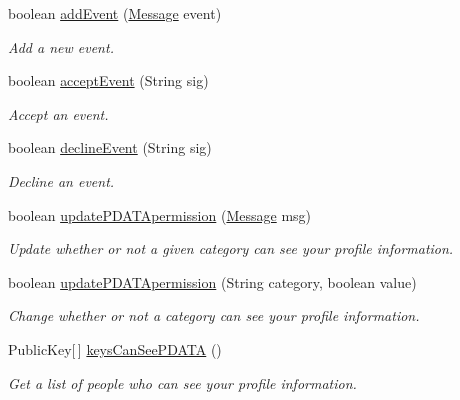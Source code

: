 \begin{DoxyCompactItemize}
boolean \hyperlink{classballmerpeak_1_1turtlenet_1_1server_1_1Database_a484dad4e2e272c608996a4a6bbb463a4}{add\-Event} (\hyperlink{classballmerpeak_1_1turtlenet_1_1shared_1_1Message}{Message} event)
\begin{DoxyCompactList}\small\item\em Add a new event. \end{DoxyCompactList}\item 
boolean \hyperlink{classballmerpeak_1_1turtlenet_1_1server_1_1Database_a30d0cd474644f531f6bfded6c9a63506}{accept\-Event} (String sig)
\begin{DoxyCompactList}\small\item\em Accept an event. \end{DoxyCompactList}\item 
boolean \hyperlink{classballmerpeak_1_1turtlenet_1_1server_1_1Database_a2618960f1f28ee6fb130fba5077d8088}{decline\-Event} (String sig)
\begin{DoxyCompactList}\small\item\em Decline an event. \end{DoxyCompactList}\item 
boolean \hyperlink{classballmerpeak_1_1turtlenet_1_1server_1_1Database_ae65d70bab4c0fba8f0c941487385c8c9}{update\-P\-D\-A\-T\-Apermission} (\hyperlink{classballmerpeak_1_1turtlenet_1_1shared_1_1Message}{Message} msg)
\begin{DoxyCompactList}\small\item\em Update whether or not a given category can see your profile information. \end{DoxyCompactList}\item 
boolean \hyperlink{classballmerpeak_1_1turtlenet_1_1server_1_1Database_aed151a8daa6202838bdc8b949d6de05c}{update\-P\-D\-A\-T\-Apermission} (String category, boolean value)
\begin{DoxyCompactList}\small\item\em Change whether or not a category can see your profile information. \end{DoxyCompactList}\item 
Public\-Key\mbox{[}$\,$\mbox{]} \hyperlink{classballmerpeak_1_1turtlenet_1_1server_1_1Database_acd908d7244665e90b2c852d2bd4d24d8}{keys\-Can\-See\-P\-D\-A\-T\-A} ()
\begin{DoxyCompactList}\small\item\em Get a list of people who can see your profile information. \end{DoxyCompactList}\item 

\end{DoxyCompactItemize}
